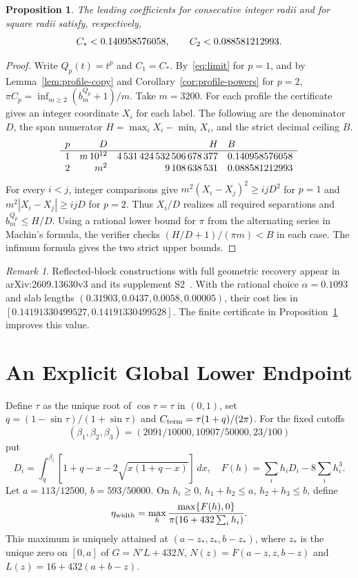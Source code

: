 \documentclass[11pt,letterpaper]{article}
\newtheorem{proposition}[theorem]{Proposition}
\theoremstyle{definition}\newtheorem{definition}[theorem]{Definition}
\theoremstyle{remark}\newtheorem{remark}[theorem]{Remark}
\newcommand{\CC}{C_\ast}
\begin{document}
\begin{proposition}\label{prop:cert-upper}
The leading coefficients for consecutive integer radii and for square
radii satisfy, respectively,
\[
 \CC<\CstarUpper,\qquad C_2<\CtwoUpper .
\]
\end{proposition}
\begin{proof}
Write $Q_p(t)=t^p$ and $C_1=\CC$. By~\eqref{eq:limit} for $p=1$, and
by Lemma~\ref{lem:profile-copy} and Corollary~\ref{cor:profile-powers}
for $p=2$, $\pi C_p=\inf_{m\ge2}(b_m^{Q_p}+1)/m$.
Take $m=3200$. For each profile the certificate gives an integer
coordinate $X_i$ for each label. The following are the denominator $D$,
the span numerator $H=\max_i X_i-\min_i X_i$, and the strict decimal
ceiling $B$.
\[
\begin{array}{c r r l}
 p & D & H & B\\ \hline
 1 & m\,10^{12} & 4\,531\,424\,532\,506\,678\,377 & 0.140958576058\\
 2 & m^2 & 9\,108\,638\,531 & 0.088581212993
\end{array}
\]
For every $i<j$, integer comparisons give
$m^2(X_i-X_j)^2\ge ijD^2$ for $p=1$ and
$m^2|X_i-X_j|\ge ijD$ for $p=2$. Thus $X_i/D$ realizes all required
separations and $b_m^{Q_p}\le H/D$. Using a rational lower bound for
$\pi$ from the alternating series in Machin's formula, the verifier checks
$(H/D+1)/(\pi m)<B$ in each case. The infimum formula gives the two
strict upper bounds.
\end{proof}

\begin{remark}
Reflected-block constructions with full geometric recovery appear in
arXiv:2609.13630v3 and its supplement S2~\cite{supp}. With the rational
choice $\alpha=0.1093$ and slab lengths
$(0.31903,\allowbreak 0.0437,\allowbreak 0.0058,\allowbreak 0.00005)$,
their cost lies in
$[0.14191330499527,0.14191330499528]$. The finite certificate in
Proposition~\ref{prop:cert-upper} improves this value.
\end{remark}

\section{An Explicit Global Lower Endpoint}

Define $\tau$ as the unique root of $\cos\tau=\tau$ in $(0,1)$, set
$q=(1-\sin\tau)/(1+\sin\tau)$ and
$C_{\rm term}=\tau(1+q)/(2\pi)$.
For the fixed cutoffs
\[
 (\beta_1,\beta_2,\beta_3)=(2091/10000,10907/50000,23/100)
\]
put
\[
 D_i=\int_q^{\beta_i}[1+q-x-2\sqrt{x(1+q-x)}]\,dx,
 \quad F(h)=\sum_i h_iD_i-8\sum_i h_i^3.
\]
Let $a=113/12500$, $b=593/50000$. On
$h_i\ge0$, $h_1+h_2\le a$, $h_2+h_3\le b$, define
\[
 \eta_{\rm width}=\max_h
 \frac{\max\{F(h),0\}}{\pi(16+432\sum_i h_i)}.
\]
This maximum is uniquely attained at $(a-z_*,z_*,b-z_*)$, where $z_*$
is the unique zero on $[0,a]$ of $G=N'L+432N$,
$N(z)=F(a-z,z,b-z)$ and $L(z)=16+432(a+b-z)$.
\end{document}
